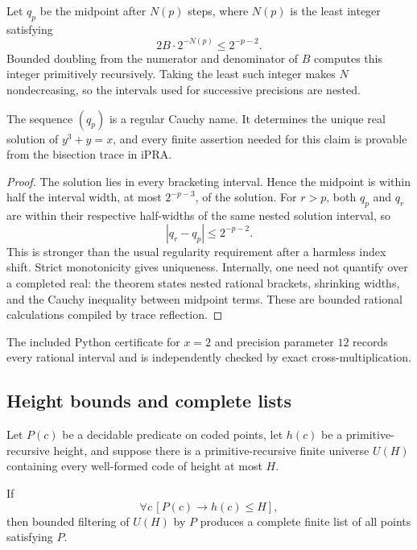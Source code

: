 Let \(q_p\) be the midpoint after \(N(p)\) steps, where \(N(p)\) is the
least integer satisfying
\[
       2B\cdot2^{-N(p)}\le 2^{-p-2}.
\]
Bounded doubling from the numerator and denominator of \(B\) computes this
integer primitively recursively.  Taking the least such integer makes \(N\)
nondecreasing, so the intervals used for successive precisions are nested.

\begin{theorem}
The sequence \((q_p)\) is a regular Cauchy name.  It determines the unique
real solution of \(y^3+y=x\), and every finite assertion needed for this claim
is provable from the bisection trace in iPRA.
\end{theorem}

\begin{proof}
The solution lies in every bracketing interval.  Hence the midpoint is within
half the interval width, at most \(2^{-p-3}\), of the solution.  For
\(r>p\), both \(q_p\) and \(q_r\) are within their respective half-widths of
the same nested solution interval, so
\[
       |q_r-q_p|\le 2^{-p-2}.
\]
This is stronger than the usual regularity requirement after a harmless index
shift.  Strict monotonicity gives uniqueness.  Internally, one need not
quantify over a completed real: the theorem states nested rational brackets,
shrinking widths, and the Cauchy inequality between midpoint terms.  These are
bounded rational calculations compiled by trace reflection.
\end{proof}

The included Python certificate for \(x=2\) and precision parameter \(12\)
records every rational interval and is independently checked by exact
cross-multiplication.

\subsection{Height bounds and complete lists}

Let \(P(c)\) be a decidable predicate on coded points, let \(h(c)\) be a
primitive-recursive height, and suppose there is a primitive-recursive finite
universe \(U(H)\) containing every well-formed code of height at most \(H\).

\begin{theorem}
If
\[
        \forall c\,[P(c)\to h(c)\le H],
\]
then bounded filtering of \(U(H)\) by \(P\) produces a complete finite list of
all points satisfying \(P\).
\end{theorem}

